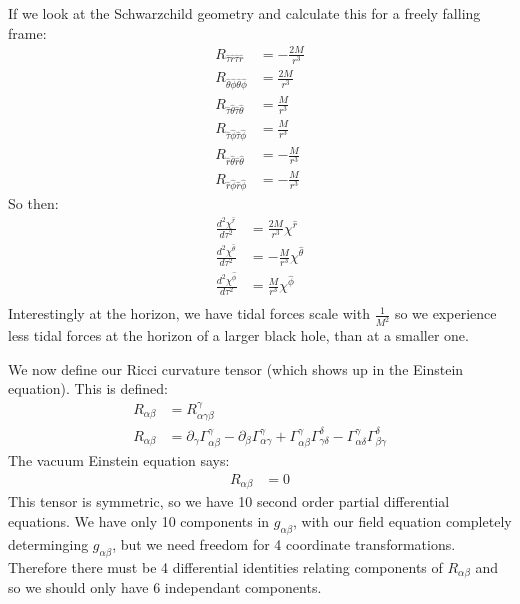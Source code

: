 If we look at the Schwarzchild geometry and calculate this for a freely falling frame:
\begin{align*}
	R_{\hat{\tau}\hat{r}\hat{\tau}\hat{r}} &= - \frac{2M}{r^3} \\
	R_{\hat{\theta}\hat{\phi}\hat{\theta}\hat{\phi}} &= \frac{2M}{r^3} \\
	R_{\hat{\tau}\hat{\theta}\hat{\tau}\hat{\theta}} &= \frac{M}{r^3} \\
	R_{\hat{\tau}\hat{\phi}\hat{\tau}\hat{\phi}} &= \frac{M}{r^3} \\
	R_{\hat{r}\hat{\theta}\hat{r}\hat{\theta}} &= -\frac{M}{r^3} \\
	R_{\hat{r}\hat{\phi}\hat{r}\hat{\phi}} &= -\frac{M}{r^3}
\end{align*}
So then:
\begin{align*}
	\frac{d^2 \chi^{\hat{r}}}{d\tau^2} &= \frac{2M}{r^3} \chi^{\hat{r}} \\
	\frac{d^2 \chi^{\hat{\theta}}}{d\tau^2} &= -\frac{M}{r^3} \chi^{\hat{\theta}} \\
	\frac{d^2 \chi^{\hat{\phi}}}{d\tau^2} &= \frac{M}{r^3} \chi^{\hat{\phi}} \\
\end{align*}
Interestingly at the horizon, we have tidal forces scale with $\frac{1}{M^2}$ so we experience less tidal forces at the horizon of a larger black hole, than at a smaller one.

We now define our Ricci curvature tensor (which shows up in the Einstein equation). This is defined:
\begin{align*}
	R_{\alpha\beta} &= R^\gamma_{\alpha\gamma\beta} \\
	R_{\alpha\beta} &= \partial_\gamma \Gamma^\gamma_{\alpha\beta} - \partial_\beta \Gamma^\gamma_{\alpha\gamma} + \Gamma^\gamma_{\alpha\beta}\Gamma^\delta_{\gamma\delta} - \Gamma^\gamma_{\alpha\delta}\Gamma^\delta_{\beta\gamma}
\end{align*}
The vacuum Einstein equation says:
\begin{align*}
	R_{\alpha\beta} &= 0
\end{align*}
This tensor is symmetric, so we have 10 second order partial differential equations. We have only 10 components in $g_{\alpha\beta}$, with our field equation completely determinging $g_{\alpha\beta}$, but we need freedom for 4 coordinate transformations.
Therefore there must be 4 differential identities relating components of $R_{\alpha\beta}$ and so we should only have 6 independant components.

